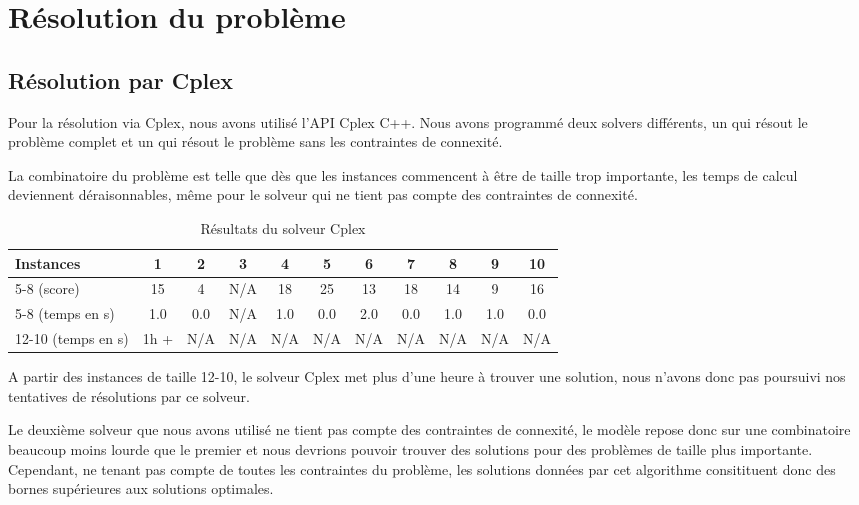 \documentclass[a4paper,11pt]{article}
\begin{document}
\newpage

\section{Résolution du problème}

\subsection{Résolution par Cplex}

Pour la résolution via Cplex, nous avons utilisé l'API Cplex C++. Nous avons programmé deux solvers différents, un qui résout le problème complet et un qui résout le problème sans les contraintes de connexité.

La combinatoire du problème est telle que dès que les instances commencent à être de taille trop importante, les temps de calcul deviennent déraisonnables, même pour le solveur qui ne tient pas compte des contraintes de connexité.

\begin{table}[h!]
\begin{center}
\begin{tabular}{|l|c|c|c|c|c|c|c|c|c|c|}
\hline
Instances & 1 & 2 & 3 & 4 & 5 & 6 & 7 & 8 & 9 & 10  \\
\hline
5-8 (score)  & 15 & 4 & N/A & 18 & 25 & 13 & 18 & 14 & 9 & 16 \\
\hline
5-8 (temps en s)  & 1.0 & 0.0 & N/A & 1.0 & 0.0 & 2.0 & 0.0 & 1.0 & 1.0 & 0.0 \\
\hline
12-10 (temps en s)  & 1h + & N/A & N/A & N/A & N/A & N/A & N/A & N/A & N/A & N/A \\
\hline
\end{tabular}
\end{center}
\caption{Résultats du solveur Cplex}
\end{table}

A partir des instances de taille 12-10, le solveur Cplex met plus d'une heure à trouver une solution, nous n'avons donc pas poursuivi nos tentatives de résolutions par ce solveur.

Le deuxième solveur que nous avons utilisé ne tient pas compte des contraintes de connexité, le modèle repose donc sur une combinatoire beaucoup moins lourde que le premier et nous devrions pouvoir trouver des solutions pour des problèmes de taille plus importante.\\
Cependant, ne tenant pas compte de toutes les contraintes du problème, les solutions données par cet algorithme consitituent donc des bornes supérieures aux solutions optimales.
\end{document}
